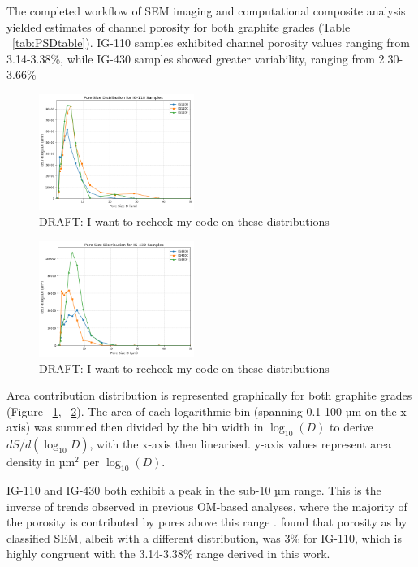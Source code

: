 \documentclass[3p,twocolumn]{elsarticle}
\begin{document}
The completed workflow of SEM imaging and computational composite analysis
yielded estimates of channel porosity for both graphite grades (Table
~\ref{tab:PSDtable}). IG-110 samples exhibited channel porosity values ranging
from 3.14-3.38\%, while IG-430 samples showed greater variability, ranging from
2.30-3.66\%

\begin{figure}
    \centering
    \includegraphics[width=0.45\textwidth]{./Media/IG110 ds LogD .png}
    \caption{DRAFT: I want to recheck my code on these distributions}
    \label{fig:IG110LogPSDs}
\end{figure}

\begin{figure}
    \centering
    \includegraphics[width=0.45\textwidth]{./Media/IG430 ds LogD .png}
    \caption{DRAFT: I want to recheck my code on these distributions}
    \label{fig:IG430LogPSDs}
\end{figure}

Area contribution distribution is represented graphically for both graphite
grades (Figure ~\ref{fig:IG110LogPSDs}, ~\ref{fig:IG430LogPSDs}). The area of
each logarithmic bin (spanning 0.1-100 µm on the x-axis) was summed then divided
by the bin width in \(\log_{10}(D)\) to derive \(dS/d(\log_{10}D)\), with the
x-axis then linearised.  y-axis values represent area density in µm\(^2\) per
\(\log_{10}(D)\).

IG-110 and IG-430 both exhibit a peak in the sub-10 µm range. This is the
inverse of trends observed in previous OM-based analyses, where the majority of
the porosity is contributed by pores above this range \citep{Huang2019}.
\citep{huang2021statistical} found that porosity as by classified SEM, albeit 
with a different distribution, was 3\% for IG-110, which is highly
congruent with the 3.14-3.38\% range derived in this work.
\end{document}
